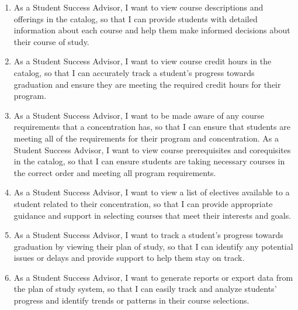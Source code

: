 \documentclass[12pt]{article}
\begin{document}
\begin{appendices}
\begin{enumerate}[label=(\roman*)]
\begin{enumerate}
            \item As a Student Success Advisor, I want to view course descriptions and offerings in the catalog, so that I can provide students with detailed information about each course and help them make informed decisions about their course of study.
            \item As a Student Success Advisor, I want to view course credit hours in the catalog, so that I can accurately track a student's progress towards graduation and ensure they are meeting the required credit hours for their program.
            \item As a Student Success Advisor, I want to be made aware of any course requirements that a concentration has, so that I can ensure that students are meeting all of the requirements for their program and concentration. As a Student Success Advisor, I want to view course prerequisites and corequisites in the catalog, so that I can ensure students are taking necessary courses in the correct order and meeting all program requirements.
            \item As a Student Success Advisor, I want to view a list of electives available to a student related to their concentration, so that I can provide appropriate guidance and support in selecting courses that meet their interests and goals.
            \item As a Student Success Advisor, I want to track a student's progress towards graduation by viewing their plan of study, so that I can identify any potential issues or delays and provide support to help them stay on track.
            \item As a Student Success Advisor, I want to generate reports or export data from the plan of study system, so that I can easily track and analyze students' progress and identify trends or patterns in their course selections.                                
        \end{enumerate}



\end{enumerate}
\end{appendices}
\end{document}
